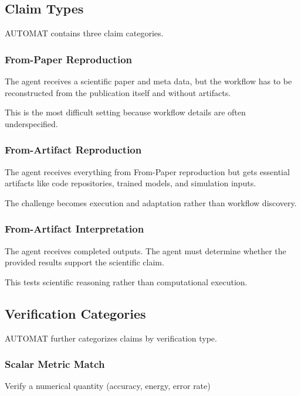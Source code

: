 \documentclass[11pt]{article}
\begin{document}
\subsection*{Claim Types}

AUTOMAT contains three claim categories.

\subsubsection*{From-Paper Reproduction}

The agent receives a scientific paper and meta data, but the workflow has to be reconstructed from the publication itself and without artifacts.

This is the most difficult setting because workflow details are often underspecified.

\subsubsection*{From-Artifact Reproduction}

The agent receives everything from From-Paper reproduction but gets essential artifacts like code repositories, trained models, and simulation inputs.

The challenge becomes execution and adaptation rather than workflow discovery.

\subsubsection*{From-Artifact Interpretation}

The agent receives completed outputs. The agent must determine whether the provided results support the scientific claim.

This tests scientific reasoning rather than computational execution.

\subsection*{Verification Categories}

AUTOMAT further categorizes claims by verification type.

\subsubsection*{Scalar Metric Match}

Verify a numerical quantity (accuracy, energy, error rate)
\end{document}
